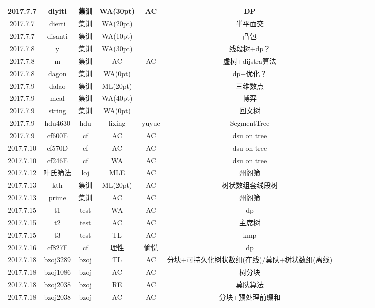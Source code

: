 \documentclass[landscape]{article}
\begin{document}
\begin{longtable}{ccccccccccc}
  \hline
  2017.7.7 & diyiti & 集训 & WA(30pt) & AC & DP\\
  \hline
  2017.7.7 & dierti & 集训 & WA(20pt) & \color{pink}{WA(20pt)} & 半平面交\\
  \hline
  2017.7.7 & disanti & 集训 & WA(10pt) & \color{pink}{WA(10pt)} & 凸包\\
  \hline
  2017.7.8 & y & 集训 & WA(30pt) & \color{pink}{WA(30pt)} & 线段树+dp？\\
  \hline
  2017.7.8 & m & 集训 & AC & AC & 虚树+dijstra算法\\
  \hline
  2017.7.8 & dagon & 集训 & WA(0pt) & \color{pink}{WA(10pt)} & dp+优化？\\
  \hline
  2017.7.9 & dalao & 集训 & ML(20pt) & \color{pink}{WA(40pt)} & 三维数点\\
  \hline
  2017.7.9 & meal & 集训 & WA(40pt) & \color{pink}{WA(50pt)} & 博弈\\
  \hline
  2017.7.9 & string & 集训 & WA(0pt) & \color{pink}{WA(0pt)} & 回文树\\
  \hline
  2017.7.9 & hdu4630 & hdu & lixing & yuyue & SegmentTree\\
  \hline
  2017.7.9 & cf600E & cf & AC & AC & dsu on tree\\
  \hline 
  2017.7.10 & cf570D & cf & AC & AC & dsu on tree\\
  \hline
  2017.7.10 & cf246E & cf & WA & AC & dsu on tree\\
  \hline
  2017.7.12 & 叶氏筛法 & loj & MLE & AC & 州阁筛\\
  \hline
  2017.7.13 & kth & 集训 & ML(20pt) & AC & 树状数组套线段树\\
  \hline
  2017.7.13 & prime & 集训 & AC & AC & 州阁筛\\
  \hline
  2017.7.15 & t1 & test & WA & AC & dp\\
  \hline
  2017.7.15 & t2 & test & AC & AC & 主席树\\
  \hline
  2017.7.15 & t3 & test & TL & AC & kmp\\
  \hline
  2017.7.16 & cf827F & cf & 理性 & 愉悦 & dp\\
  \hline
  2017.7.18 & bzoj3289 & bzoj & TL & AC & 分块+可持久化树状数组(在线)/莫队+树状数组(离线)\\
  \hline
  2017.7.18 & bzoj1086 & bzoj & AC & AC & 树分块\\
  \hline
  2017.7.18 & bzoj2038 & bzoj & RE & AC & 莫队算法\\
  \hline
  2017.7.18 & bzoj2038 & bzoj & AC & AC & 分块+预处理前缀和\\

\end{longtable}
\end{document}
